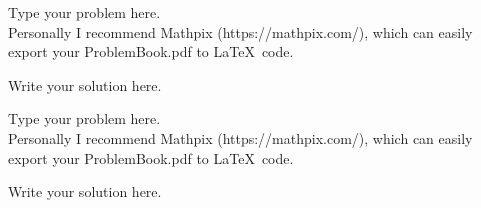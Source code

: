 \documentclass[10pt, a4paper]{article}
\newenvironment{Solution}{
  \large
  }
{
  \newpage
}
\newcommand\CourseName{Stochastic Processes} %
\newcommand\CourseID{Math 632} %
\newcommand\hwnumber{1}                          %
\newcommand\Information{Guy Matz}                %
\begin{document}
\begin{titlepage}
\end{titlepage}


\begin{Problem}
Type your problem here. \\
Personally I recommend Mathpix (https://mathpix.com/), which can easily export your ProblemBook.pdf to \LaTeX \ code.
\end{Problem}
\begin{Solution}
Write your solution here.

\end{Solution}

\begin{Problem}
Type your problem here. \\
Personally I recommend Mathpix (https://mathpix.com/), which can easily export your ProblemBook.pdf to \LaTeX \ code.
\end{Problem}
\begin{Solution}
Write your solution here.

\end{Solution}
\end{document}
